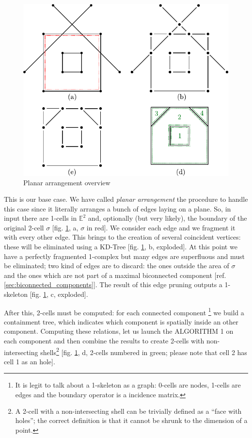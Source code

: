 \begin{figure}[h]
    \centering
    \includegraphics{./img/ch2-planararrangement.pdf}
    \caption{Planar arrangement overview}
    \label{img:planar}
\end{figure}

This is our base case. We have called \textit{planar arrangement} 
the procedure to handle this case since
it literally arranges a bunch of edges laying on a plane.
So, in input there are 1-cells in $\mathbb{E}^2$ and, optionally (but very
likely), the boundary of the original 2-cell $\sigma$ 
[fig. \ref{img:planar}, a, $\sigma$ in red].
We consider each edge and we fragment it with every other edge. This brings to
the creation of several coincident vertices: these will be eliminated
using a KD-Tree [fig. \ref{img:planar}, b, exploded]. 
At this point we have a perfectly fragmented 1-complex but many
edges are superfluous and must be eliminated; two kind of edges
are to discard: the ones outside the area of $\sigma$ and the ones
which are not part of a maximal biconnected component 
[ref. \ref{sec:biconnected_components}].
The result of this edge pruning outputs a
1-skeleton [fig. \ref{img:planar}, c, exploded].

After this, 2-cells must be computed:
for each connected component%
\footnote{It is legit to talk about a 1-skeleton as a graph: 
0-cells are nodes, 1-cells are edges and the boundary operator is
a incidence matrix.} we build a containment tree, which indicates
which component is spatially inside an other component.
Computing these relations, let us launch the ALGORITHM 1 \cite{Paoluzzi}
on each component and then combine the results to create 2-cells with non-intersecting 
shells\footnote{A 2-cell with a non-intersecting shell can be trivially defined
as a ``face with holes''; the correct definition is that it cannot 
be shrunk to the dimension of a point.} 
[fig. \ref{img:planar}, d, 2-cells numbered in green; please note that
cell 2 has cell 1 as an hole].


